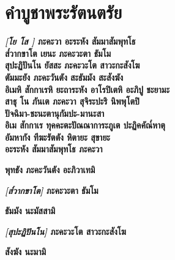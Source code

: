 \chapter*{คำบูชาพระรัตนตรัย}
\delegateSetUseNext
\textbf{\textit{[โย โส ]} ภะคะวา อะระหัง สัมมาสัมพุทโธ}\\
\textbf{ส๎วากขาโต เยนะ ภะคะวะตา ธัมโม}\\
\textbf{สุปะฏิปันโน  ยัสสะ ภะคะวะโต สาวะกะสังโฆ}\\
\textbf{ตัมมะยัง ภะคะวันตัง สะธัมมัง สะสังฆัง}\\
\textbf{อิเมหิ สักกาเรหิ ยะถาระหัง อาโรปิเตหิ อะภิปู ชะยามะ}\\
\textbf{สาธุ โน ภันเต ภะคะวา สุจิระปะริ นิพพุโตปิ}\\
\textbf{ปัจฉิมา-ชะนะตานุกัมปะ-มานะสา}\\
\textbf{อิเม สักกาเร ทุคคะตะปัณณาการะภูเต ปะฏิคคัณ๎หาตุ}\\
\textbf{อัมหากัง ทีฆะรัตตัง หิตายะ สุขายะ}\\

\textbf{อะระหัง สัมมาสัมพุทโธ ภะคะวา}\\

\begin{english}
	\textbf{พุทธัง ภะคะวันตัง อะภิวาเทมิ} \\
\end{english}

\textbf{\textit{[ส๎วากขาโต]} ภะคะวะตา ธัมโม}\\

\begin{english}
	\textbf{ธัมมัง นะมัสสามิ} \\
\end{english}

\textbf{\textit{[สุปะฏิปันโน]} ภะคะวะโต สาวะกะสังโฆ}\\

\begin{english}
	\textbf{สังฆัง นะมามิ} \\
\end{english}

\clearpage
